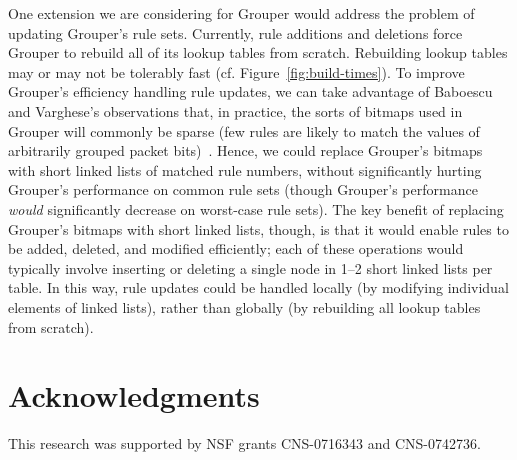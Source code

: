 \documentclass[10pt, conference, compsocconf]{IEEEtran}
\begin{document}
One extension we are considering for Grouper would address the problem of
updating Grouper's rule sets.  Currently, rule additions and deletions force
Grouper to rebuild all of its lookup tables from scratch.  Rebuilding lookup
tables may or may not be tolerably fast (cf. Figure~\ref{fig:build-times}).  To
improve Grouper's efficiency handling rule updates, we can take advantage of
Baboescu and Varghese's observations that, in practice, the sorts of bitmaps
used in Grouper will commonly be sparse (few rules are likely to match the
values of arbitrarily grouped packet bits)~\cite{babo-journal}.  Hence, we could
replace Grouper's bitmaps with short linked lists of matched rule numbers,
without significantly hurting Grouper's performance on common rule sets (though
Grouper's performance {\em would} significantly decrease on worst-case rule
sets).  The key benefit of replacing Grouper's bitmaps with short linked lists,
though, is that it would enable rules to be added, deleted, and modified
efficiently; each of these operations would typically involve inserting or
deleting a single node in 1--2 short linked lists per table.  In this way, rule
updates could be handled locally (by modifying individual elements of linked
lists), rather than globally (by rebuilding all lookup tables from scratch).



\section*{Acknowledgments}
This research was supported by NSF grants CNS-0716343 and CNS-0742736.



\end{document}
